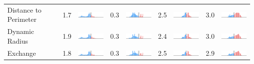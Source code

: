 \begin{table}
\begin{tabular}{lcccccccc}
Distance to Perimeter  &     1.7 &     \includegraphics[width=7em]{comp_hist/il_rohrbach} &     0.3 &     \includegraphics[width=7em]{comp_hist/md_rohrbach} &     2.5 &     \includegraphics[width=7em]{comp_hist/nc_rohrbach} &     3.0 &     \includegraphics[width=7em]{comp_hist/tx_rohrbach} \\
Dynamic Radius         &     1.9 &   \includegraphics[width=7em]{comp_hist/il_dyn_radius} &     0.3 &   \includegraphics[width=7em]{comp_hist/md_dyn_radius} &     2.4 &   \includegraphics[width=7em]{comp_hist/nc_dyn_radius} &     3.0 &   \includegraphics[width=7em]{comp_hist/tx_dyn_radius} \\
Exchange               &     1.8 &     \includegraphics[width=7em]{comp_hist/il_exchange} &     0.3 &     \includegraphics[width=7em]{comp_hist/md_exchange} &     2.5 &     \includegraphics[width=7em]{comp_hist/nc_exchange} &     2.9 &     \includegraphics[width=7em]{comp_hist/tx_exchange} \\

\end{tabular}
\end{table}
